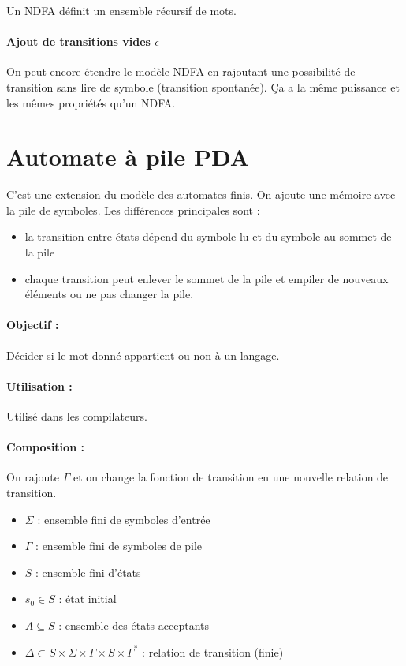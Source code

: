 \begin{myprop}
	Un NDFA définit un ensemble récursif de mots.
\end{myprop}

\paragraph{Ajout de transitions vides $\epsilon$} On peut encore étendre le modèle NDFA en
rajoutant une possibilité de transition sans lire de symbole (transition
spontanée). Ça a la même puissance et les mêmes propriétés qu'un NDFA.


\section{Automate à pile PDA}
\label{sub:automate_pile}
C'est une extension du modèle des automates finis. On ajoute une mémoire avec
la pile de symboles.
Les différences principales sont :
\begin{itemize}
	\item la transition entre états dépend du symbole lu et du symbole au
		sommet de la pile
	\item	chaque transition peut enlever le sommet de la pile et empiler
		de nouveaux éléments ou ne pas changer la pile.
\end{itemize}

\paragraph{Objectif :} Décider si le mot donné appartient ou non à un langage.

\paragraph{Utilisation :} Utilisé dans les compilateurs.

\paragraph{Composition :}
On rajoute $\Gamma$ et on change la fonction de transition en une nouvelle
relation de transition.
\begin{itemize}
	\item $\Sigma$ : ensemble fini de symboles d'entrée
	\item $\Gamma$ : ensemble fini de symboles de pile
	\item $S$ : ensemble fini d'états
	\item $s_0 \in S$ : état initial
	\item $A \subseteq S$ : ensemble des états acceptants
	\item $\Delta \subset S \times \Sigma \times \Gamma \times S \times
		\Gamma^*$ : relation de transition (finie)
\end{itemize}

